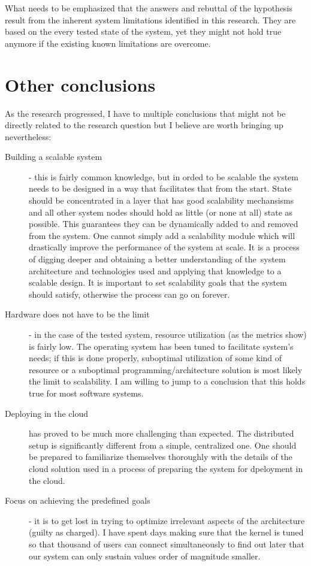 \documentclass{uvamscse}
\begin{document}
What needs to be emphasized that the answers and rebuttal of the hypothesis result from the inherent system limitations identified in this research. They are based on the every tested state of the system, yet they might not hold true anymore if the existing known limitations are overcome.

\section{Other conclusions}
As the research progressed, I have to multiple conclusions that might not be directly related to the research question but I believe are worth bringing up nevertheless:
\begin{description}
  \item[Building a scalable system] - this is fairly common knowledge, but in orded to be scalable the system needs to be designed in a way that facilitates that from the start. State should be concentrated in a layer that has good scalability mechansisms and all other system nodes should hold as little (or none at all) state as possible. This guarantees they can be dynamically added to and removed from the system. One cannot simply add a scalability module which will drastically improve the performance of the system at scale. It is a process of digging deeper and obtaining a better understanding of the system architecture and technologies used and applying that knowledge to a scalable design. It is important to set scalability goals that the system should satisfy, otherwise the process can go on forever.
  \item[Hardware does not have to be the limit] - in the case of the tested system, resource utilization (as the metrics show) is fairly low. The operating system has been tuned to facilitate system's needs; if this is done properly, suboptimal utilization of some kind of resource or a suboptimal programming/architecture solution is most likely the limit to scalability. I am willing to jump to a conclusion that this holds true for most software systems.
  \item[Deploying in the cloud] has proved to be much more challenging than expected. The distributed setup is significantly different from a simple, centralized one. One should be prepared to familiarize themselves thoroughly with the details of the cloud solution used in a process of preparing the system for dpeloyment in the cloud.
  \item[Focus on achieving the predefined goals] - it is to get lost in trying to optimize irrelevant aspects of the architecture (guilty as charged). I have spent days making sure that the kernel is tuned so that thousand of users can connect simultaneously to find out later that our system can only sustain values order of magnitude smaller.

\end{description}
\end{document}
